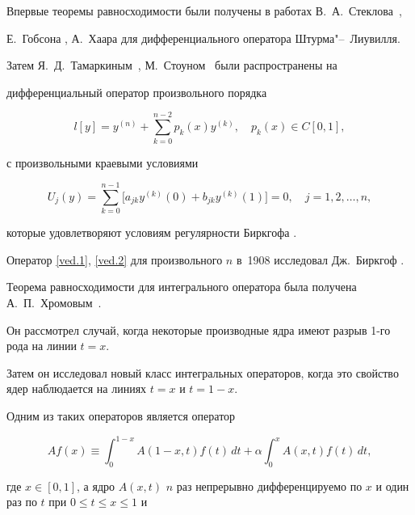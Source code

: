 \makerutitle




Впервые теоремы равносходимости были получены в работах В.~А.~Стеклова~\cite{kor:bib:1},

Е.~Гобсона \cite{kor:bib:2}, А.~Хаара \cite{kor:bib:3} для дифференциального оператора Штурма"--~Лиувилля. 

Затем  Я.~Д.~Та\-мар\-ки\-ным~\cite{kor:bib:4}, М.~Стоуном~\cite{kor:bib:5} были распространены на

дифференциальный оператор произвольного порядка

\begin{equation}\label{ved.1}

l[y]=y^{(n)}+\sum\limits_{k=0}^{n-2}p_k(x)y^{(k)},\quad

p_k(x)\in C[0,1],

\end{equation}

с произвольными краевыми условиями

\begin{equation}\label{ved.2}

U_j(y)=\sum\limits_{k=0}^{n-1}\bigl[a_{jk}y^{(k)}(0)+b_{jk}y^{(k)}(1)\bigr]=0,\quad

j=1,2,\ldots,n,

\end{equation}

которые удовлетворяют условиям регулярности Биркгофа \cite[с.~66--67]{kor:bib:6}.

Оператор \eqref{ved.1}, \eqref{ved.2} для  произвольного $n$ в~1908 исследовал Дж.~Биркгоф \cite{kor:bib:7, kor:bib:8}. 



Теорема равносходимости для интегрального оператора была получена А.~П.~Хромовым~\cite{kor:bib:9}. 

Он рассмотрел случай, когда некоторые производные ядра имеют разрыв 1-го рода на линии $t=x$. 

Затем он исследовал новый класс интегральных операторов, когда это свойство ядер наблюдается на линиях $t=x$ и $t=1-x$. 

Одним из таких операторов является оператор

$$

Af(x)\equiv \int_0^{1-x} A(1-x,t)f(t)\,dt+\alpha\int _0^{x} A(x,t)f(t)\,dt,

$$

где $x\in[0,1]$, а ядро $A(x,t)$ $n$ раз непрерывно дифференцируемо по $x$ и один раз по $t$ при $0\leq t\leq x\leq 1$ и 

